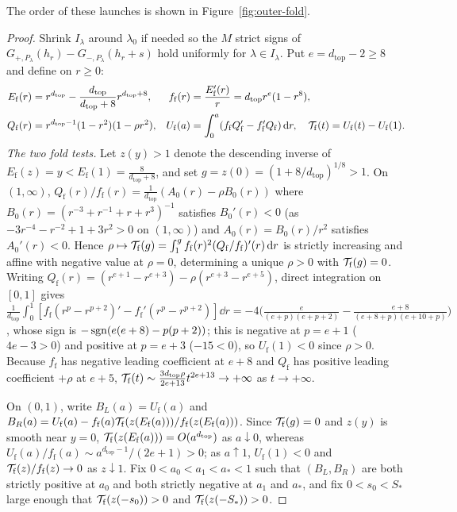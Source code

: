 The order of these launches is shown in Figure~\ref{fig:outer-fold}.

\begin{proof}
Shrink $I_\lambda$ around $\lambda_0$ if needed so the $M$ strict signs of
$G_{+,P_\lambda}(h_r)-G_{-,P_\lambda}(h_r+s)$ hold uniformly for $\lambda\in I_\lambda$. Put
$e=d_{\mathrm{top}}-2\ge 8$ and define on $r\ge 0$:
\begin{align*}
  E_{\mathrm{f}}(r) &= r^{d_{\mathrm{top}}} -
  \frac{d_{\mathrm{top}}}{d_{\mathrm{top}}+8}r^{d_{\mathrm{top}}+8}, & f_{\mathrm{f}}(r) &=
  \frac{E_{\mathrm{f}}'(r)}{r} = d_{\mathrm{top}} r^e(1-r^8), \\
  Q_{\mathrm{f}}(r) &= r^{d_{\mathrm{top}}-1}(1-r^2)(1-\rho r^2), & U_{\mathrm{f}}(a) &= \int_0^a
  (f_{\mathrm{f}}Q_{\mathrm{f}}' - f_{\mathrm{f}}'Q_{\mathrm{f}})\,\mathrm{d} r, \quad \mathcal{T}_{\mathrm{f}}(t) =
  U_{\mathrm{f}}(t)-U_{\mathrm{f}}(1).
\end{align*}
\smallskip\noindent\emph{The two fold tests.} Let $z(y)>1$ denote the descending inverse of
$E_{\mathrm{f}}(z)=y<E_{\mathrm{f}}(1)=\frac{8}{d_{\mathrm{top}}+8}$, and set
$g=z(0)=(1+8/d_{\mathrm{top}})^{1/8}>1$. On $(1,\infty)$,
$Q_{\mathrm{f}}(r)/f_{\mathrm{f}}(r)=\frac{1}{d_{\mathrm{top}}}(A_0(r)-\rho B_0(r))$ where
$B_0(r)=(r^{-3}+r^{-1}+r+r^3)^{-1}$ satisfies $B_0'(r)<0$ (as $-3r^{-4}-r^{-2}+1+3r^2>0$ on
$(1,\infty)$) and $A_0(r)=B_0(r)/r^2$ satisfies $A_0'(r)<0$. Hence
$\rho\mapsto\mathcal{T}_{\mathrm{f}}(g)=\int_1^g f_{\mathrm{f}}(r)^2(Q_{\mathrm{f}}/f_{\mathrm{f}})'(r)\,\mathrm{d} r$
is strictly increasing and affine with negative value at $\rho=0$, determining a unique $\rho>0$ with
$\mathcal{T}_{\mathrm{f}}(g)=0$. Writing $Q_{\mathrm{f}}(r)=(r^{e+1}-r^{e+3})-\rho(r^{e+3}-r^{e+5})$, direct
integration on $[0,1]$ gives
$\frac{1}{d_{\mathrm{top}}}\int_0^1[f_{\mathrm{f}}(r^p-r^{p+2})'-f_{\mathrm{f}}'(r^p-r^{p+2})]\dd r =
-4\bigl(\frac{e}{(e+p)(e+p+2)}-\frac{e+8}{(e+8+p)(e+10+p)}\bigr)$, whose sign is
$-\operatorname{sgn}(e(e+8)-p(p+2))$; this is negative at $p=e+1$ ($4e-3>0$) and positive at $p=e+3$ ($-15<0$), so
$U_{\mathrm{f}}(1)<0$ since $\rho>0$. Because $f_{\mathrm{f}}$ has negative leading coefficient at
$e+8$ and $Q_{\mathrm{f}}$ has positive leading coefficient $+\rho$ at $e+5$, $\mathcal{T}_{\mathrm{f}}(t)\sim
\frac{3d_{\mathrm{top}}\rho}{2e+13}t^{2e+13}\to+\infty$ as $t\to+\infty$.

On $(0,1)$, write $B_L(a)=U_{\mathrm{f}}(a)$ and
$B_R(a)=U_{\mathrm{f}}(a)-f_{\mathrm{f}}(a)\mathcal{T}_{\mathrm{f}}(z(E_{\mathrm{f}}(a)))/f_{\mathrm{f}}(z(E_{\mathrm{f}}(a)))$.
Since $\mathcal{T}_{\mathrm{f}}(g)=0$ and $z(y)$ is smooth near $y=0$,
$\mathcal{T}_{\mathrm{f}}(z(E_{\mathrm{f}}(a)))=O(a^{d_{\mathrm{top}}})$ as $a\downarrow 0$, whereas
$U_{\mathrm{f}}(a)/f_{\mathrm{f}}(a)\sim a^{d_{\mathrm{top}}-1}/(2e+1)>0$; as $a\uparrow 1$,
$U_{\mathrm{f}}(1)<0$ and $\mathcal{T}_{\mathrm{f}}(z)/f_{\mathrm{f}}(z)\to 0$ as $z\downarrow 1$. Fix
$0<a_0<a_1<a_*<1$ such that $(B_L,B_R)$ are both strictly positive at $a_0$ and both strictly negative
at $a_1$ and $a_*$, and fix $0<s_0<S_*$ large enough that $\mathcal{T}_{\mathrm{f}}(z(-s_0))>0$ and
$\mathcal{T}_{\mathrm{f}}(z(-S_*))>0$.


\end{proof}
